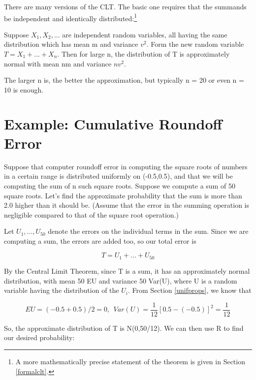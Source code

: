 There are many versions of the CLT.  The basic one requires that the
summands be independent and identically distributed:\footnote{A more
mathematically precise statement of the theorem is given in Section
\ref{formalclt}.}

\begin{theorem}
\label{impreciseclt}

Suppose $X_1, X_2, ...$ are independent random variables, all having the
same distribution which has mean m and variance $v^2$.  Form the new
random variable $T = X_1+...+X_n$.  Then for large n, the distribution
of T is approximately normal with mean nm and variance $nv^2$.

\end{theorem}

The larger n is, the better the approximation, but typically n = 20 or
even n = 10 is enough.

\section{Example:  Cumulative Roundoff Error}

Suppose that computer roundoff error in computing the square roots of
numbers in a certain range is distributed uniformly on (-0.5,0.5), and
that we will be computing the sum of n such square roots.  Suppose we
compute a sum of 50 square roots.  Let's find the approximate
probability that the sum is more than 2.0 higher than it should be.
(Assume that the error in the summing operation is negligible compared
to that of the square root operation.)

Let $U_1,...,U_{50}$ denote the errors on the individual terms in the
sum.  Since we are computing a sum, the errors are added too, so our
total error is

\begin{equation}
T = U_1 + ... + U_{50}
\end{equation}

By the Central Limit Theorem, since T is a sum, it has an approximately
normal distribution, with mean 50 EU and variance 50 Var(U), where U is
a random variable having the distribution of the $U_i$.  From Section
\ref{unifprops}, we know that 

\begin{equation}
EU = (-0.5+0.5) / 2 = 0, ~~ Var(U) = \frac{1}{12} [0.5-(-0.5)]^2 =
\frac{1}{12}
\end{equation}

So, the approximate distribution of T is N(0,50/12).  We can then use R to
find our desired probability:

